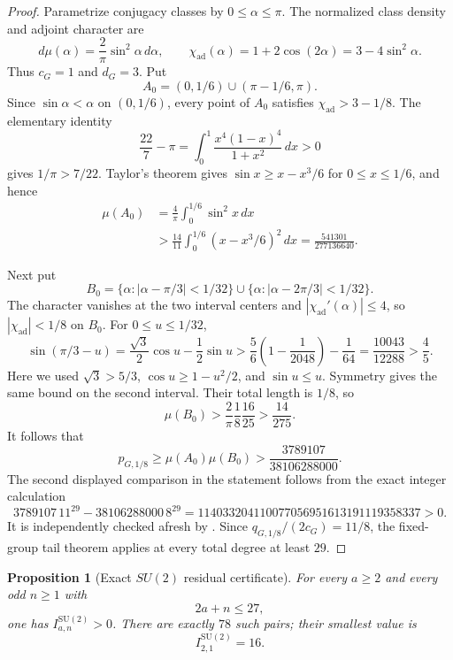 \documentclass[11pt,reqno]{amsart}
\theoremstyle{plain}
\newtheorem{proposition}[theorem]{Proposition}
\theoremstyle{definition}
\newcommand{\chiad}{\chi_{\mathrm{ad}}}
\begin{document}
\begin{proof}
Parametrize conjugacy classes by $0\leq\alpha\leq\pi$.  The normalized
class density and adjoint character are
\[
 d\mu(\alpha)=\frac2\pi\sin^2\alpha\,d\alpha,
 \qquad
 \chiad(\alpha)=1+2\cos(2\alpha)=3-4\sin^2\alpha.
\]
Thus $c_G=1$ and $d_G=3$.  Put
\[
 A_0=(0,1/6)\cup(\pi-1/6,\pi).
\]
Since $\sin\alpha<\alpha$ on $(0,1/6)$, every point of $A_0$ satisfies
$\chiad>3-1/8$.  The elementary identity
\[
 \frac{22}{7}-\pi
 =\int_0^1\frac{x^4(1-x)^4}{1+x^2}\,dx>0
\]
gives $1/\pi>7/22$.  Taylor's theorem gives
$\sin x\geq x-x^3/6$ for $0\leq x\leq1/6$, and hence
\[
 \begin{aligned}
 \mu(A_0)
 &=\frac4\pi\int_0^{1/6}\sin^2x\,dx\\
 &>\frac{14}{11}\int_0^{1/6}(x-x^3/6)^2\,dx
 =\frac{541301}{277136640}.
 \end{aligned}
\]

Next put
\[
 B_0=\{\alpha:|\alpha-\pi/3|<1/32\}
 \cup\{\alpha:|\alpha-2\pi/3|<1/32\}.
\]
The character vanishes at the two interval centers and
$|\chiad'(\alpha)|\leq4$, so $|\chiad|<1/8$ on $B_0$.  For
$0\leq u\leq1/32$,
\[
 \sin(\pi/3-u)
 =\frac{\sqrt3}{2}\cos u-\frac12\sin u
 >\frac56\left(1-\frac1{2048}\right)-\frac1{64}
 =\frac{10043}{12288}>\frac45.
\]
Here we used $\sqrt3>5/3$, $\cos u\geq1-u^2/2$, and $\sin u\leq u$.
Symmetry gives the same bound on the second interval.  Their total length is
$1/8$, so
\[
 \mu(B_0)>
 \frac2\pi\frac18\frac{16}{25}>\frac{14}{275}.
\]
It follows that
\[
 p_{G,1/8}\geq\mu(A_0)\mu(B_0)
 >\frac{3789107}{38106288000}.
\]
The second displayed comparison in the statement follows from the exact
integer calculation
\[
 3789107\,11^{29}-38106288000\,8^{29}
 =114033204110077056951613191119358337>0.
\]
It is independently checked afresh by
.  Since
$q_{G,1/8}/(2c_G)=11/8$, the fixed-group tail theorem applies at every total
degree at least $29$.
\end{proof}

\begin{proposition}[Exact $SU(2)$ residual certificate]
\label{prop:su2-residual-certificate}
For every $a\geq2$ and every odd $n\geq1$ with
\[
 2a+n\leq27,
\]
one has $I^{\mathrm{SU}(2)}_{a,n}>0$.  There are exactly $78$ such pairs;
their smallest value is
\[
 I^{\mathrm{SU}(2)}_{2,1}=16.
\]
\end{proposition}
\end{document}
